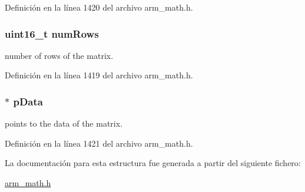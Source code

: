 Definición en la línea 1420 del archivo arm\+\_\+math.\+h.

\subsubsection[{\texorpdfstring{num\+Rows}{numRows}}]{\setlength{\rightskip}{0pt plus 5cm}uint16\+\_\+t num\+Rows}\hypertarget{structarm__matrix__instance__q15_a1bcf80ccdc2acc29198f1592ae300390}{}\label{structarm__matrix__instance__q15_a1bcf80ccdc2acc29198f1592ae300390}
number of rows of the matrix. 

Definición en la línea 1419 del archivo arm\+\_\+math.\+h.

\subsubsection[{\texorpdfstring{p\+Data}{pData}}]{$\ast$ p\+Data}\hypertarget{structarm__matrix__instance__q15_a817ede38365e63e561a12069c6c5c087}{}\label{structarm__matrix__instance__q15_a817ede38365e63e561a12069c6c5c087}
points to the data of the matrix. 

Definición en la línea 1421 del archivo arm\+\_\+math.\+h.



La documentación para esta estructura fue generada a partir del siguiente fichero\+:\begin{DoxyCompactItemize}
\item 
\hyperlink{arm__math_8h}{arm\+\_\+math.\+h}\end{DoxyCompactItemize}
